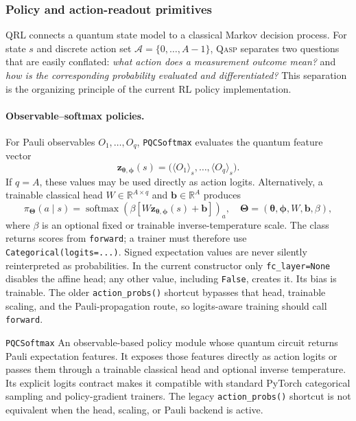 \documentclass[10pt]{article}
\newcommand{\qasp}{\textsc{Qasp}}
\newcommand{\code}[1]{\texttt{#1}}
\newcommand{\R}{\mathbb{R}}
\newcommand{\A}{\mathcal{A}}
\begin{document}
\subsubsection{Policy and action-readout primitives}
\label{sec:policies}

QRL connects a quantum state model to a classical Markov decision process.
For state $s$ and discrete action set $\A=\{0,\ldots,A-1\}$, \qasp{}
separates two questions that are easily conflated: \emph{what action does a
measurement outcome mean?} and \emph{how is the corresponding probability
evaluated and differentiated?}  This separation is the organizing principle
of the current RL policy implementation.

\paragraph{Observable--softmax policies.}

For Pauli observables $O_1,\ldots,O_q$, \code{PQCSoftmax} evaluates the
quantum feature vector
\begin{equation}
  \bm{z}_{\bm{\theta},\bm{\phi}}(s)
  = \big(\langle O_1\rangle_s,\ldots,\langle O_q\rangle_s\big).
  \label{eq:quantum-feature-vector}
\end{equation}
If $q=A$, these values may be used directly as action logits.  Alternatively,
a trainable classical head $W\in\R^{A\times q}$ and $\bm b\in\R^A$ produces
\begin{equation}
  \pi_{\bm{\Theta}}(a\mid s)
  = \operatorname{softmax}\!\left(
      \beta\left[W\bm{z}_{\bm{\theta},\bm{\phi}}(s)+\bm b\right]
    \right)_a,
  \quad
  \bm{\Theta}=(\bm{\theta},\bm{\phi},W,\bm b,\beta),
  \label{eq:softmax_policy}
\end{equation}
where $\beta$ is an optional fixed or trainable inverse-temperature scale.
The class returns scores from \code{forward}; a trainer must therefore use
\code{Categorical(logits=...)}.  Signed expectation values are never silently
reinterpreted as probabilities.  In the current constructor only
\code{fc\_layer=None} disables the affine head; any other value, including
\code{False}, creates it.  Its bias is trainable.  The older
\code{action\_probs()} shortcut bypasses that head, trainable scaling, and the
Pauli-propagation route, so logits-aware training should call \code{forward}.

\begin{qaspfeature}{\code{PQCSoftmax}}
An observable-based policy module whose quantum circuit returns Pauli
expectation features.  It exposes those features directly as action logits or
passes them through a trainable classical head and optional inverse
temperature.  Its explicit logits contract makes it compatible with standard
PyTorch categorical sampling and policy-gradient trainers.  The legacy
\code{action\_probs()} shortcut is not equivalent when the head, scaling, or
Pauli backend is active.
\end{qaspfeature}
\end{document}
